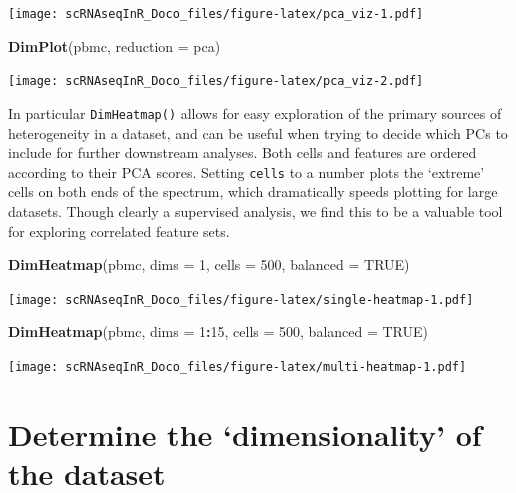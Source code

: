\documentclass[
]{book}
\newenvironment{Shaded}{\begin{snugshade}}{\end{snugshade}}
\newcommand{\AttributeTok}[1]{\textcolor[rgb]{0.13,0.29,0.53}{#1}}
\newcommand{\ConstantTok}[1]{\textcolor[rgb]{0.56,0.35,0.01}{#1}}
\newcommand{\DecValTok}[1]{\textcolor[rgb]{0.00,0.00,0.81}{#1}}
\newcommand{\FunctionTok}[1]{\textcolor[rgb]{0.13,0.29,0.53}{\textbf{#1}}}
\newcommand{\NormalTok}[1]{#1}
\newcommand{\SpecialCharTok}[1]{\textcolor[rgb]{0.81,0.36,0.00}{\textbf{#1}}}
\newcommand{\StringTok}[1]{\textcolor[rgb]{0.31,0.60,0.02}{#1}}
\begin{document}
\texttt{[image: scRNAseqInR\_Doco\_files/figure-latex/pca\_viz-1.pdf]}

\begin{Shaded}
\begin{Highlighting}[]
\FunctionTok{DimPlot}\NormalTok{(pbmc, }\AttributeTok{reduction =} \StringTok{\textquotesingle{}pca\textquotesingle{}}\NormalTok{)}
\end{Highlighting}
\end{Shaded}

\texttt{[image: scRNAseqInR\_Doco\_files/figure-latex/pca\_viz-2.pdf]}

In particular \texttt{DimHeatmap()} allows for easy exploration of the primary sources of heterogeneity in a dataset, and can be useful when trying to decide which PCs to include for further downstream analyses. Both cells and features are ordered according to their PCA scores. Setting \texttt{cells} to a number plots the `extreme' cells on both ends of the spectrum, which dramatically speeds plotting for large datasets. Though clearly a supervised analysis, we find this to be a valuable tool for exploring correlated feature sets.

\begin{Shaded}
\begin{Highlighting}[]
\FunctionTok{DimHeatmap}\NormalTok{(pbmc, }\AttributeTok{dims =} \DecValTok{1}\NormalTok{, }\AttributeTok{cells =} \DecValTok{500}\NormalTok{, }\AttributeTok{balanced =} \ConstantTok{TRUE}\NormalTok{)}
\end{Highlighting}
\end{Shaded}

\texttt{[image: scRNAseqInR\_Doco\_files/figure-latex/single-heatmap-1.pdf]}

\begin{Shaded}
\begin{Highlighting}[]
\FunctionTok{DimHeatmap}\NormalTok{(pbmc, }\AttributeTok{dims =} \DecValTok{1}\SpecialCharTok{:}\DecValTok{15}\NormalTok{, }\AttributeTok{cells =} \DecValTok{500}\NormalTok{, }\AttributeTok{balanced =} \ConstantTok{TRUE}\NormalTok{)}
\end{Highlighting}
\end{Shaded}

\texttt{[image: scRNAseqInR\_Doco\_files/figure-latex/multi-heatmap-1.pdf]}

\hypertarget{determine-the-dimensionality-of-the-dataset}{%
\section{Determine the `dimensionality' of the dataset}\label{determine-the-dimensionality-of-the-dataset}}
\end{document}
